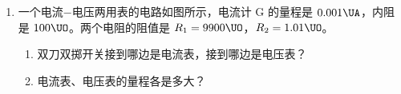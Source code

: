 \documentclass[\gkver]{gaokaozhenti}
\begin{document}
\begin{enumerate}
{（2）光路图如图所示。


评分标准：全题 13 分，（1）8 分，（2）5 分。

（1）中，能列出两个文字方程的给 2 分；经过文字运算，得到物体高度的文字表达式，并正确代入需要的数值的，再给 4 分；最后算出正确答案的，共给 8 分。列出两个文字方程后，立即正确代入需要的数值的，给 6 分；正确算出答案的，共给 8 分。

（2）中，用透镜前面或后面的焦点都可以，同样给分。图中未用箭头表示光线进行方向的，扣 1 分；图中尺寸完全不合比例的，扣 1 分。
}

\item
一个电流$-$电压两用表的电路如图所示，电流计 G 的量程是 $0.001\UA$，内阻是 $100\UO$。两个电阻的阻值是 $R_{1}=9900\UO$，$R_{2}=1.01\UO$。

\begin{enumerate}
	\item
	双刀双掷开关接到哪边是电流表，接到哪边是电压表？
	\item
	电流表、电压表的量程各是多大？
\end{enumerate}


\end{enumerate}
\end{document}
